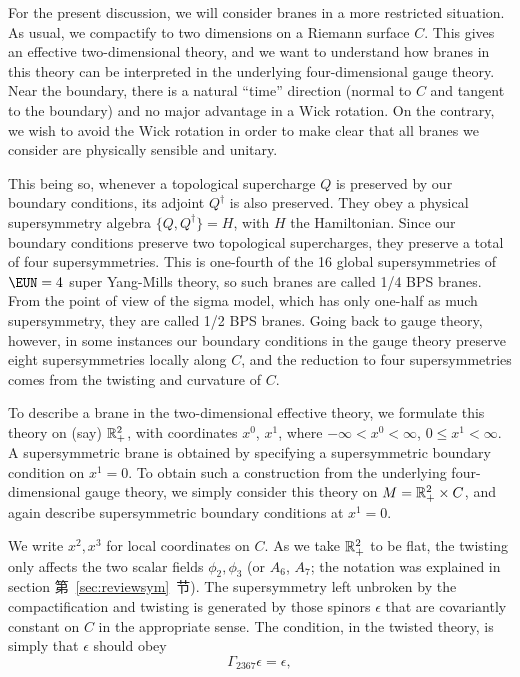 For the present discussion, we will consider branes in a more
restricted situation.  As usual, we compactify to two dimensions
on a Riemann surface $C$.  This gives an effective two-dimensional
theory, and we want to understand how branes in this theory can be
interpreted in the underlying four-dimensional gauge theory.  Near
the boundary, there is a natural ``time'' direction (normal to $C$
and tangent to the boundary) and no major advantage in a Wick
rotation. On the contrary, we wish to avoid the Wick rotation in
order to make clear that all branes we consider are physically
sensible and unitary.

This being so, whenever a topological supercharge $Q$ is preserved
by our boundary conditions, its adjoint $Q^\dagger$ is also
preserved.  They obey a physical supersymmetry algebra
$\{Q,Q^\dagger\}=H$, with $H$ the Hamiltonian.  Since our boundary
conditions preserve two topological supercharges, they preserve a
total of four supersymmetries.  This is one-fourth of the 16
global supersymmetries of ${\EUN}=4$ super Yang-Mills theory, so
such branes are called 1/4 BPS branes.  From the point of view of
the sigma model, which has only one-half as much supersymmetry,
they are called 1/2 BPS branes.  Going back to gauge theory,
however, in some instances our boundary conditions in the gauge
theory preserve eight supersymmetries locally along $C$, and the
reduction to four supersymmetries comes from the twisting and
curvature of $C$.

To describe a brane in the two-dimensional effective theory, we
formulate this theory on (say) $\Bbb{R}^2_+$, with coordinates
$x^0$, $x^1$, where $-\infty< x^0< \infty$, $0\leq x^1 <\infty$. A
supersymmetric  brane is obtained by specifying a supersymmetric
boundary condition on $x^1=0$.  To obtain such a construction from
the underlying four-dimensional gauge theory, we simply consider
this  theory on $M=\Bbb{R}^2_+\times C$,  and again describe
supersymmetric boundary conditions at $x^1=0$.

We write $x^2,x^3$ for local coordinates on $C$.   As we take
$\Bbb{R}^2_+$ to be flat, the twisting only affects the two scalar
fields $\phi_2,\phi_3$ (or $A_6$, $A_7$; the notation was
explained in section 第~\ref{sec:reviewsym}~节). The supersymmetry left unbroken
by the compactification and twisting is generated by those spinors
$\epsilon$ that are covariantly constant on $C$ in the appropriate
sense.  The condition, in the twisted theory, is simply that
$\epsilon$ should obey %
\setcounter{equation}{0}
\begin{equation}\label{eq:ucuv}
\Gamma_{2367}\epsilon=\epsilon,
\end{equation}


